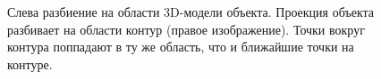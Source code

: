 \begin{figure}[t]
    \centering
    \begin{minipage}[h]{0.49\linewidth}
    \end{minipage}
    \hfill
    \begin{minipage}[h]{0.49\linewidth}
    \end{minipage}
    \caption{Слева разбиение на области 3D-модели объекта. Проекция объекта
        разбивает на области контур (правое изображение). Точки вокруг контура
        поппадают в ту же область, что и ближайшие точки на контуре.
    }
    \label{fig:projected-areas}
\end{figure}

